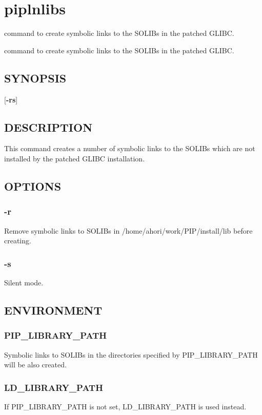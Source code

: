\hypertarget{group__piplnlibs}{\section{piplnlibs}
\label{group__piplnlibs}
}


command to create symbolic links to the S\-O\-L\-I\-Bs in the patched G\-L\-I\-B\-C.  


command to create symbolic links to the S\-O\-L\-I\-Bs in the patched G\-L\-I\-B\-C. \hypertarget{group__piplnlibs_synopsis}{}\subsection{S\-Y\-N\-O\-P\-S\-I\-S}\label{group__piplnlibs_synopsis}
{ }\mbox{[}{\bfseries -\/rs}\mbox{]}\hypertarget{group__piplnlibs_description}{}\subsection{D\-E\-S\-C\-R\-I\-P\-T\-I\-O\-N}\label{group__piplnlibs_description}
This command creates a number of symbolic links to the S\-O\-L\-I\-Bs which are not installed by the patched G\-L\-I\-B\-C installation.\hypertarget{group__piplnlibs_options}{}\subsection{O\-P\-T\-I\-O\-N\-S}\label{group__piplnlibs_options}
\hypertarget{group__piplnlibs_remove}{}\subsubsection{-\/r}\label{group__piplnlibs_remove}
Remove symbolic links to S\-O\-L\-I\-Bs in /home/ahori/work/\-P\-I\-P/install/lib before creating.\hypertarget{group__piplnlibs_silent}{}\subsubsection{-\/s}\label{group__piplnlibs_silent}
Silent mode.\hypertarget{group__piplnlibs_environment}{}\subsection{E\-N\-V\-I\-R\-O\-N\-M\-E\-N\-T}\label{group__piplnlibs_environment}
\hypertarget{group__piplnlibs_PIP_LIBRARY_PATH}{}\subsubsection{P\-I\-P\-\_\-\-L\-I\-B\-R\-A\-R\-Y\-\_\-\-P\-A\-T\-H}\label{group__piplnlibs_PIP_LIBRARY_PATH}
Symbolic links to S\-O\-L\-I\-Bs in the directories specified by P\-I\-P\-\_\-\-L\-I\-B\-R\-A\-R\-Y\-\_\-\-P\-A\-T\-H will be also created.\hypertarget{group__piplnlibs_LD_LIBRARY_PATH}{}\subsubsection{L\-D\-\_\-\-L\-I\-B\-R\-A\-R\-Y\-\_\-\-P\-A\-T\-H}\label{group__piplnlibs_LD_LIBRARY_PATH}
If P\-I\-P\-\_\-\-L\-I\-B\-R\-A\-R\-Y\-\_\-\-P\-A\-T\-H is not set, L\-D\-\_\-\-L\-I\-B\-R\-A\-R\-Y\-\_\-\-P\-A\-T\-H is used instead. 